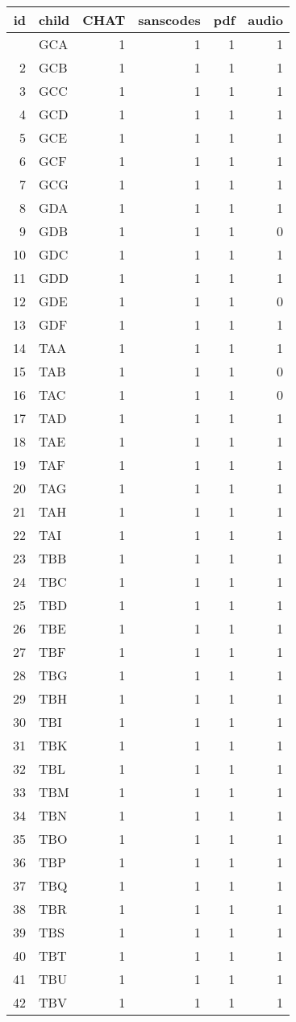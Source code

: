 \documentclass[
  12pt,
]{article}
\begin{document}
\begin{longtable}[]{@{}rlrrrr@{}}
\toprule\noalign{}
id & child & CHAT & sanscodes & pdf & audio \\
\midrule\noalign{}
\endhead
\bottomrule\noalign{}
\endlastfoot
1 & GCA & 1 & 1 & 1 & 1 \\
2 & GCB & 1 & 1 & 1 & 1 \\
3 & GCC & 1 & 1 & 1 & 1 \\
4 & GCD & 1 & 1 & 1 & 1 \\
5 & GCE & 1 & 1 & 1 & 1 \\
6 & GCF & 1 & 1 & 1 & 1 \\
7 & GCG & 1 & 1 & 1 & 1 \\
8 & GDA & 1 & 1 & 1 & 1 \\
9 & GDB & 1 & 1 & 1 & 0 \\
10 & GDC & 1 & 1 & 1 & 1 \\
11 & GDD & 1 & 1 & 1 & 1 \\
12 & GDE & 1 & 1 & 1 & 0 \\
13 & GDF & 1 & 1 & 1 & 1 \\
14 & TAA & 1 & 1 & 1 & 1 \\
15 & TAB & 1 & 1 & 1 & 0 \\
16 & TAC & 1 & 1 & 1 & 0 \\
17 & TAD & 1 & 1 & 1 & 1 \\
18 & TAE & 1 & 1 & 1 & 1 \\
19 & TAF & 1 & 1 & 1 & 1 \\
20 & TAG & 1 & 1 & 1 & 1 \\
21 & TAH & 1 & 1 & 1 & 1 \\
22 & TAI & 1 & 1 & 1 & 1 \\
23 & TBB & 1 & 1 & 1 & 1 \\
24 & TBC & 1 & 1 & 1 & 1 \\
25 & TBD & 1 & 1 & 1 & 1 \\
26 & TBE & 1 & 1 & 1 & 1 \\
27 & TBF & 1 & 1 & 1 & 1 \\
28 & TBG & 1 & 1 & 1 & 1 \\
29 & TBH & 1 & 1 & 1 & 1 \\
30 & TBI & 1 & 1 & 1 & 1 \\
31 & TBK & 1 & 1 & 1 & 1 \\
32 & TBL & 1 & 1 & 1 & 1 \\
33 & TBM & 1 & 1 & 1 & 1 \\
34 & TBN & 1 & 1 & 1 & 1 \\
35 & TBO & 1 & 1 & 1 & 1 \\
36 & TBP & 1 & 1 & 1 & 1 \\
37 & TBQ & 1 & 1 & 1 & 1 \\
38 & TBR & 1 & 1 & 1 & 1 \\
39 & TBS & 1 & 1 & 1 & 1 \\
40 & TBT & 1 & 1 & 1 & 1 \\
41 & TBU & 1 & 1 & 1 & 1 \\
42 & TBV & 1 & 1 & 1 & 1 \\
\end{longtable}
\end{document}
